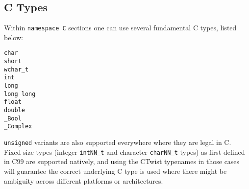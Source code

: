 \documentclass[a4paper,11pt]{article}
\newcommand{\tcode}[1]{\texttt{#1}}
\begin{document}
\subsection{C Types} \label{app:c_types}
Within \tcode{namespace C} sections one can use several fundamental C types, listed below:
\begin{lstlisting}
char
short
wchar_t
int
long
long long
float
double
_Bool
_Complex
\end{lstlisting}
\tcode{unsigned} variants are also supported everywhere where they are legal in C.
Fixed-size types (integer \tcode{intNN\_t} and character \tcode{charNN\_t} types) as first defined in C99 are supported natively, and using the CTwist typenames in those cases will guarantee the correct underlying C type is used where there might be ambiguity across different platforms or architectures.
\end{document}
